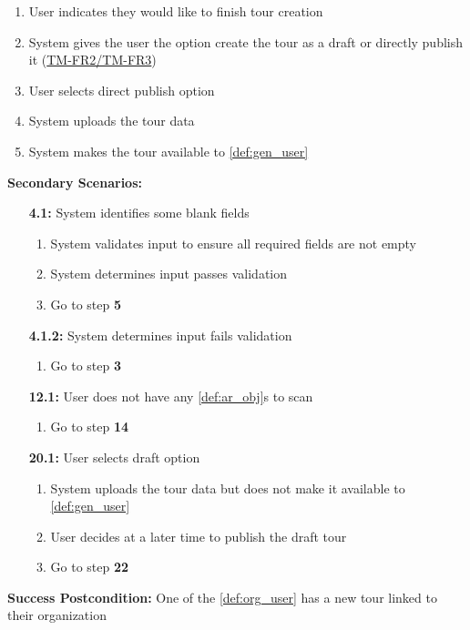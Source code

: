 \documentclass{article}
\begin{document}
\begin{enumerate}[label=\textbf{UC\arabic*}]
\begin{enumerate}[label=\textbf{\arabic*.}]
            \item User indicates they would like to finish tour creation
            \item System gives the user the option create the tour as a draft or directly publish it (\hyperref[ssub:tour_management]{TM-FR2/TM-FR3})
            \item User selects direct publish option
            \item System uploads the tour data
            \item System makes the tour available to \ref{def:gen_user}
        \end{enumerate}

        \textbf{Secondary Scenarios:}
        \begin{itemize}
            \item[{\bf 4.1:}] System identifies some blank fields
            \begin{enumerate}[label=\textbf{\arabic*.}]
                \item System validates input to ensure all required fields are not empty
                \item System determines input passes validation
                \item Go to step \textbf{5}
            \end{enumerate}
            \item[{\bf 4.1.2:}] System determines input fails validation
            \begin{enumerate}[label=\textbf{\arabic*.}]
                \item Go to step \textbf{3}
            \end{enumerate}
            \item[{\bf 12.1:}] User does not have any \ref{def:ar_obj}s to scan
            \begin{enumerate}[label=\textbf{\arabic*.}]
                \item Go to step \textbf{14}
            \end{enumerate}
            \item[{\bf 20.1:}] User selects draft option
            \begin{enumerate}[label=\textbf{\arabic*.}]
                \item System uploads the tour data but does not make it available to \ref{def:gen_user}
                \item User decides at a later time to publish the draft tour
                \item Go to step \textbf{22}
            \end{enumerate}
        \end{itemize}
        \textbf{Success Postcondition:} One of the \ref{def:org_user} has a new tour linked to their organization


\end{enumerate}
\end{document}
